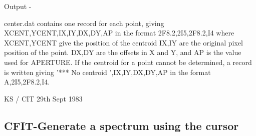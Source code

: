 \begin{description}
\begin{terminalv}
 Output -

 center.dat contains one record for each point, giving
            XCENT,YCENT,IX,IY,DX,DY,AP
            in the format 2F8.2,2I5,2F8.2,I4 where
            XCENT,YCENT give the position of the centroid
            IX,IY are the original pixel position of the point.
            DX,DY are the offsets in X and Y, and
            AP is the value used for APERTURE.
            If the centroid for a point cannot be determined, a
            record is written giving
            '*** No centroid ',IX,IY,DX,DY,AP
            in the format A,2I5,2F8.2,I4.

                                     KS / CIT 29th Sept 1983
\end{terminalv}
\end{description}
\subsection{CFIT-\label{CFIT}Generate a spectrum using the cursor}
